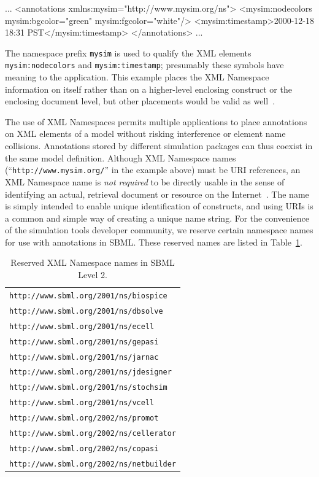 \documentclass[10pt]{cekarticle}
\newcommand{\vref}[1]{\ref{#1}}
\begin{document}
\begin{example}
...
<annotations xmlns:mysim="http://www.mysim.org/ns">
    <mysim:nodecolors mysim:bgcolor="green" mysim:fgcolor="white"/>
    <mysim:timestamp>2000-12-18 18:31 PST</mysim:timestamp>
</annotations>
...
\end{example}

The namespace prefix \texttt{mysim} is used to qualify the XML elements
\texttt{mysim:nodecolors} and \texttt{mysim:timestamp}; presumably these
symbols have meaning to the application.  This example places the XML
Namespace information on  itself rather than on a
higher-level enclosing construct or the enclosing document level, but other
placements would be valid as well~\citep{bray:1999}.

The use of XML Namespaces permits multiple applications to place
annotations on XML elements of a model without risking interference or
element name collisions.  Annotations stored by different simulation
packages can thus coexist in the same model definition.  Although XML
Namespace names (``\texttt{http://www.mysim.org/}'' in the example above)
must be URI references, an XML Namespace name is \emph{not required} to be
directly usable in the sense of identifying an actual, retrieval document
or resource on the Internet~\citep{bray:1999}.  The name is simply intended
to enable unique identification of constructs, and using URIs is a common
and simple way of creating a unique name string.  For the convenience of
the simulation tools developer community, we reserve certain namespace
names for use with annotations in SBML.  These reserved names are listed in
Table~\vref{tab:reserved-urls}.

\begin{table}[b]
  \vspace*{5pt}
  \centering
  \begin{tabular}{l}
    \toprule
    \texttt{http://www.sbml.org/2001/ns/biospice}\\
    \texttt{http://www.sbml.org/2001/ns/dbsolve}\\
    \texttt{http://www.sbml.org/2001/ns/ecell}\\
    \texttt{http://www.sbml.org/2001/ns/gepasi}\\
    \texttt{http://www.sbml.org/2001/ns/jarnac}\\
    \texttt{http://www.sbml.org/2001/ns/jdesigner}\\
    \texttt{http://www.sbml.org/2001/ns/stochsim}\\
    \texttt{http://www.sbml.org/2001/ns/vcell}\\
    \texttt{http://www.sbml.org/2002/ns/promot}\\
    \texttt{http://www.sbml.org/2002/ns/cellerator}\\
    \texttt{http://www.sbml.org/2002/ns/copasi}\\
    \texttt{http://www.sbml.org/2002/ns/netbuilder}\\
    \bottomrule
  \end{tabular}
  \caption{Reserved XML Namespace names in SBML Level 2.}
  \label{tab:reserved-urls}
\end{table}
\end{document}

